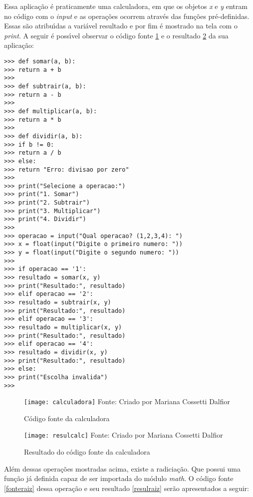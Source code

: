 Essa aplica\c{c}\~{a}o \'{e} praticamente uma calculadora, em que os objetos \textsl{x} e \textsl{y} entram no c\'{o}digo com o \textsl{input} e as opera\c{c}\~{o}es ocorrem atrav\'{e}s das fun\c{c}\~{o}es pr\'{e}-definidas. Essas s\~{a}o atribu\'{\i}das a vari\'{a}vel resultado e por fim \'{e} mostrado na tela com o \textsl{print}.  A seguir \'{e} poss\'{\i}vel observar o c\'{o}digo fonte \ref{fontecalc} e o resultado \ref{resulcalc} da sua aplica\c{c}\~{a}o:
    
\begin{lstlisting}
>>> def somar(a, b):
>>> return a + b
>>> 
>>> def subtrair(a, b):
>>> return a - b
>>> 
>>> def multiplicar(a, b):
>>> return a * b
>>> 
>>> def dividir(a, b):
>>> if b != 0:
>>> return a / b
>>> else:
>>> return "Erro: divisao por zero"
>>> 
>>> print("Selecione a operacao:")
>>> print("1. Somar")
>>> print("2. Subtrair")
>>> print("3. Multiplicar")
>>> print("4. Dividir")
>>> 
>>> operacao = input("Qual operacao? (1,2,3,4): ")
>>> x = float(input("Digite o primeiro numero: "))
>>> y = float(input("Digite o segundo numero: "))
>>> 
>>> if operacao == '1':
>>> resultado = somar(x, y)
>>> print("Resultado:", resultado)
>>> elif operacao == '2':
>>> resultado = subtrair(x, y)
>>> print("Resultado:", resultado)
>>> elif operacao == '3':
>>> resultado = multiplicar(x, y)
>>> print("Resultado:", resultado)
>>> elif operacao == '4':
>>> resultado = dividir(x, y)
>>> print("Resultado:", resultado)
>>> else:
>>> print("Escolha invalida")
>>> 
\end{lstlisting}
    
    \begin{figure}[H]
    	\begin{center}
    		\caption{C\'{o}digo fonte da calculadora} \label{fontecalc}
    		\texttt{[image: calculadora]} 
    		\newline
    		Fonte: Criado por Mariana Cossetti Dalfior
    	\end{center}
    \end{figure}

 \begin{figure}[H]
	\begin{center}
		\caption{Resultado do c\'{o}digo fonte da calculadora} \label{resulcalc}
		\texttt{[image: resulcalc]} 
		\newline
		Fonte: Criado por Mariana Cossetti Dalfior
	\end{center}
\end{figure}

Al\'{e}m dessas opera\c{c}\~{o}es mostradas acima, existe a radicia\c{c}\~{a}o. Que possui uma fun\c{c}\~{a}o j\'{a} definida capaz de ser importada do m\'{o}dulo \textsl{math}. O c\'{o}digo fonte \ref{fonteraiz} dessa opera\c{c}\~{a}o e seu resultado \ref{resulraiz} ser\~{a}o apresentados a seguir:

